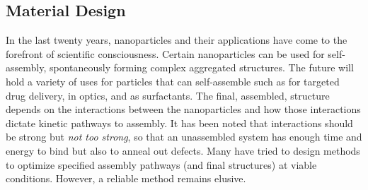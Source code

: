 \documentclass[11pt]{article}
\begin{document}


\subsection*{Material Design}

In the last twenty years, nanoparticles and their applications have come to the forefront of scientific consciousness.
Certain nanoparticles can be used for self-assembly, spontaneously forming complex aggregated structures. The future will hold a variety of uses for particles that can self-assemble such as for targeted drug delivery,
in optics,
and as surfactants.
The final, assembled, structure depends on the interactions between the nanoparticles and how those interactions dictate kinetic pathways to assembly. It has been noted that interactions should be strong but {\it not too strong}, so that an unassembled system has enough time and energy to bind but also to anneal out defects.
Many have tried to design methods to optimize specified assembly pathways (and final structures) at viable conditions.  However, a reliable method remains elusive. 
\end{document}
